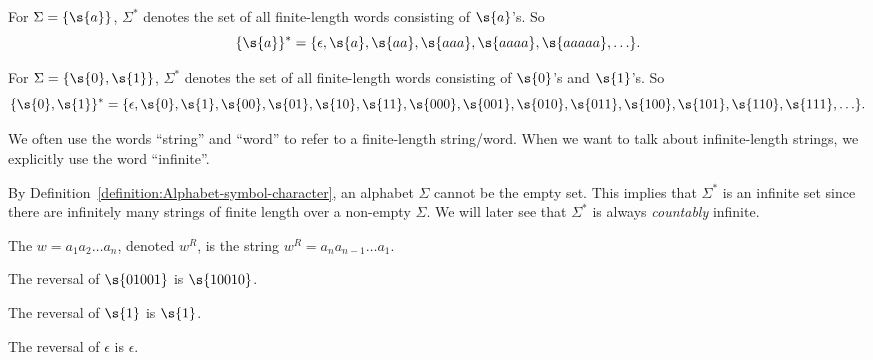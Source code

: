 \begin{example}[$\{a\}^*$] \label{example:a}
For $\Sigma = \{\s{a}\}$, $\Sigma^*$ denotes the set of all finite-length words consisting of $\s{a}$'s. 
So
\[
    \{\s{a}\}^* = \{\epsilon, \s{a}, \s{aa}, \s{aaa}, \s{aaaa}, \s{aaaaa}, \ldots \}.
\]
\end{example}

\begin{example}[$\{0,1\}^*$] \label{example:01}
For $\Sigma = \{\s{0},\s{1}\}$, $\Sigma^*$ denotes the set of all finite-length words consisting of $\s{0}$'s and $\s{1}$'s. 
So
\[
    \{\s{0},\s{1}\}^* = \{\epsilon, \s{0}, \s{1}, \s{00}, \s{01}, \s{10}, \s{11}, \s{000}, \s{001}, \s{010}, \s{011}, \s{100}, \s{101}, \s{110}, \s{111}, \ldots\}.
\]
\end{example}

\begin{note} \label{note:Finite-vs-infinite-strings}
We often use the words ``string'' and ``word'' to refer to a finite-length string/word. 
When we want to talk about infinite-length strings, we explicitly use the word ``infinite''.
\end{note}

\begin{note} \label{note:Size-of-Sigma}
By Definition~\ref{definition:Alphabet-symbol-character}, an alphabet $\Sigma$ cannot be the empty set. 
This implies that $\Sigma^*$ is an infinite set since there are infinitely many strings of finite length over a non-empty $\Sigma$. We will later see that $\Sigma^*$ is always \emph{countably} infinite.
\end{note}

\begin{definition} \label{definition:Reversal-of-a-string}
The  $w = a_1a_2\ldots a_n$, denoted $w^R$, is the string $w^R = a_na_{n-1}\ldots a_1$.
\end{definition}

\begin{example}[Reversal of $01001$] \label{example:Reversal-of-01001}
The reversal of $\s{01001}$ is $\s{10010}$.
\end{example}
\begin{example}[Reversal of $1$] \label{example:Reversal-of-1}
The reversal of $\s{1}$ is $\s{1}$.
\end{example}

\begin{example} \label{example:Reversal-of-epsilon}
The reversal of $\epsilon$ is $\epsilon$.
\end{example}

